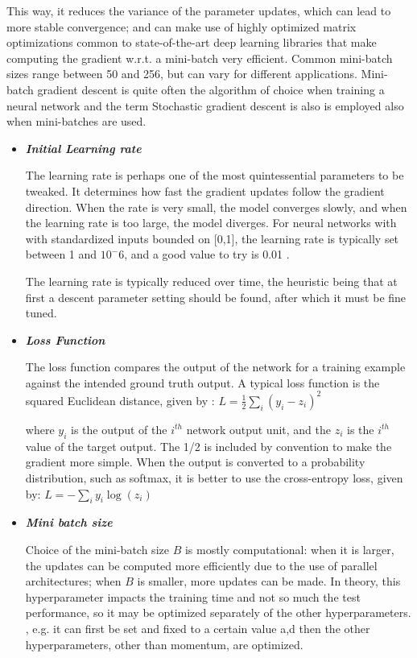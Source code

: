 \documentclass[twoside]{article}
\begin{document}
This way, it reduces the variance of the parameter updates, which can lead to more stable convergence; and  can make use of highly optimized matrix optimizations common to state-of-the-art deep learning libraries that make computing the gradient w.r.t. a mini-batch very efficient. Common mini-batch sizes range between 50 and 256, but can vary for different applications. Mini-batch gradient descent is quite often the algorithm of choice when training a neural network and the term Stochastic gradient descent is also is employed also when mini-batches are used.
\begin{itemize}

\item \textit{\textbf{Initial Learning rate}}

The learning rate is perhaps one of the most quintessential parameters to be tweaked. It determines how fast the gradient updates follow the gradient direction. When the rate is very small, the model converges slowly, and when the learning rate is too large, the model diverges. For neural networks with with standardized inputs bounded on [0,1], the learning rate is typically set between 1 and $10^-6$, and a good value to try is 0.01 \cite{bengio2012practical}.

The learning rate is typically reduced over time, the heuristic being that at first a descent parameter setting should be found, after which it must be fine tuned.
\item \textbf{\textit{Loss Function}}

The loss function compares the output of the network for a training example against the intended ground truth output. A typical loss function is the squared Euclidean distance, given by :
$L = \frac{1}{2} \sum_i (y_i - z_i)^2$

where $y_i$ is the output of the $i^{th}$ network output unit, and the $z_i$ is the $i^{th}$ value of the target output. The 1/2 is included by convention to make the gradient more simple. When the output is converted to a probability distribution, such as softmax, it is better to use the cross-entropy loss, given by: $L = -\sum_i y_i \log(z_i)$
\item \textit{\textbf{Mini batch size}} 

Choice of the mini-batch size $B$ is mostly computational: when it is larger, the updates can be computed more efficiently due to the use of parallel architectures; when $B$ is smaller, more updates can be made. In theory, this hyperparameter impacts the training time and not so much the test performance, so it may be optimized separately of the other hyperparameters. \cite{bengio2012practical} , e.g. it can first be set and fixed to a certain value a,d then the other hyperparameters, other than momentum, are optimized.


\end{itemize}
\end{document}
